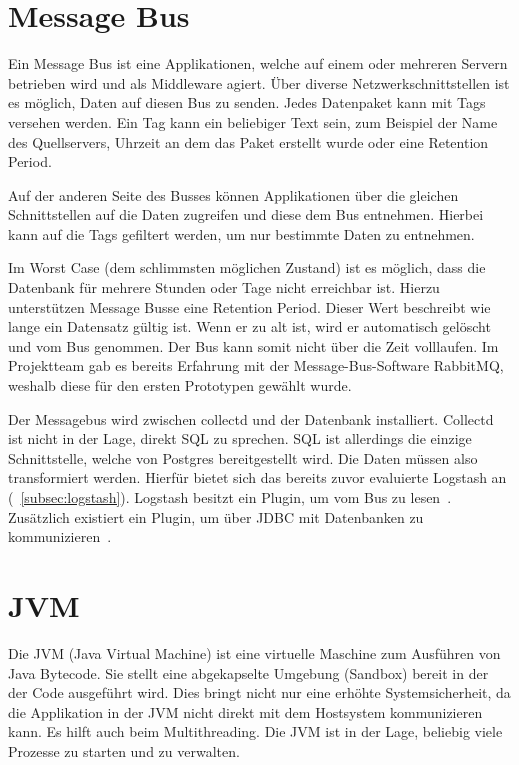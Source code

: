 \section{Message Bus}
Ein Message Bus ist eine Applikationen, welche auf einem oder mehreren Servern
betrieben wird und als \gls{Middleware} agiert. Über diverse
Netzwerkschnittstellen ist es möglich, Daten auf diesen Bus zu senden. Jedes
Datenpaket kann mit Tags versehen werden. Ein Tag kann ein beliebiger Text
sein, zum Beispiel der Name des Quellservers, Uhrzeit an dem das Paket erstellt
wurde oder eine Retention Period.

Auf der anderen Seite des Busses können Applikationen über die gleichen
Schnittstellen auf die Daten zugreifen und diese dem Bus entnehmen. Hierbei
kann auf die Tags gefiltert werden, um nur bestimmte Daten zu entnehmen.

Im Worst Case (dem schlimmsten möglichen Zustand) ist es möglich, dass die
Datenbank für mehrere Stunden oder Tage nicht erreichbar ist. Hierzu
unterstützen Message Busse eine Retention Period. Dieser Wert beschreibt wie
lange ein Datensatz gültig ist. Wenn er zu alt ist, wird er automatisch
gelöscht und vom Bus genommen. Der Bus kann somit nicht über die Zeit
volllaufen. Im Projektteam gab es bereits Erfahrung mit der
Message-Bus-Software RabbitMQ, weshalb diese für den ersten Prototypen gewählt
wurde.

Der Messagebus wird zwischen collectd und der Datenbank installiert. Collectd
ist nicht in der Lage, direkt SQL zu sprechen. SQL ist allerdings die einzige
Schnittstelle, welche von Postgres bereitgestellt wird. Die Daten müssen also
transformiert werden. Hierfür bietet sich das bereits zuvor evaluierte Logstash
an (~\ref{subsec:logstash}). Logstash besitzt ein Plugin, um vom Bus zu
lesen~\cite{logstash-rabbitmq}. Zusätzlich existiert ein Plugin, um über JDBC
mit Datenbanken zu kommunizieren~\cite{logstash-jdbc}.
\tm%

\section{JVM}
Die \gls{JVM} (Java Virtual Machine) ist eine virtuelle Maschine zum Ausführen
von Java Bytecode. Sie stellt eine abgekapselte Umgebung (Sandbox) bereit in
der der Code ausgeführt wird. Dies bringt nicht nur eine erhöhte
Systemsicherheit, da die Applikation in der JVM nicht direkt mit dem Hostsystem
kommunizieren kann. Es hilft auch beim Multithreading. Die JVM ist in der Lage,
beliebig viele Prozesse zu starten und zu verwalten.

